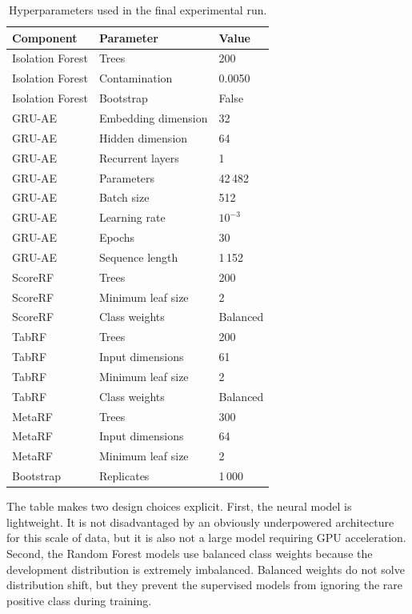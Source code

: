 \documentclass[journal]{IEEEtran}
\begin{document}
\begin{table}[t]
\centering
\caption{Hyperparameters used in the final experimental run.}
\label{tab:hyperparameters}
\begin{tabular}{lll}
\toprule
\textbf{Component} & \textbf{Parameter} & \textbf{Value} \\
\midrule
Isolation Forest & Trees & 200 \\
Isolation Forest & Contamination & 0.0050 \\
Isolation Forest & Bootstrap & False \\
GRU-AE & Embedding dimension & 32 \\
GRU-AE & Hidden dimension & 64 \\
GRU-AE & Recurrent layers & 1 \\
GRU-AE & Parameters & 42\,482 \\
GRU-AE & Batch size & 512 \\
GRU-AE & Learning rate & $10^{-3}$ \\
GRU-AE & Epochs & 30 \\
GRU-AE & Sequence length & 1\,152 \\
ScoreRF & Trees & 200 \\
ScoreRF & Minimum leaf size & 2 \\
ScoreRF & Class weights & Balanced \\
TabRF & Trees & 200 \\
TabRF & Input dimensions & 61 \\
TabRF & Minimum leaf size & 2 \\
TabRF & Class weights & Balanced \\
MetaRF & Trees & 300 \\
MetaRF & Input dimensions & 64 \\
MetaRF & Minimum leaf size & 2 \\
Bootstrap & Replicates & 1\,000 \\
\bottomrule
\end{tabular}
\end{table}

The table makes two design choices explicit. First, the neural model is lightweight. It is not disadvantaged by an obviously underpowered architecture for this scale of data, but it is also not a large model requiring GPU acceleration. Second, the Random Forest models use balanced class weights because the development distribution is extremely imbalanced. Balanced weights do not solve distribution shift, but they prevent the supervised models from ignoring the rare positive class during training.
\end{document}
